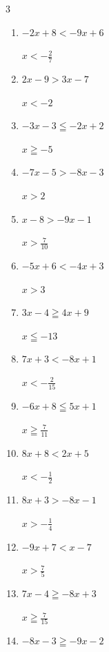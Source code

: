 \begin{multicols}{3}
\begin{enumerate}
        $\displaystyle x\geqq \frac{3}{4}$

  \item $-2x+8<-9x+6$

        $\displaystyle x<-\frac{2}{7}$

  \item $2x-9>3x-7$

        $\displaystyle x<-2$

  \item $-3x-3\leqq -2x+2$

        $\displaystyle x\geqq -5$

  \item $-7x-5>-8x-3$

        $\displaystyle x>2$

  \item $x-8>-9x-1$

        $\displaystyle x>\frac{7}{10}$

  \item $-5x+6<-4x+3$

        $\displaystyle x>3$

  \item $3x-4\geqq 4x+9$

        $\displaystyle x\leqq -13$

  \item $7x+3<-8x+1$

        $\displaystyle x<-\frac{2}{15}$

  \item $-6x+8\leqq 5x+1$

        $\displaystyle x\geqq \frac{7}{11}$

\columnbreak %

  \item $8x+8<2x+5$

        $\displaystyle x<-\frac{1}{2}$

  \item $8x+3>-8x-1$

        $\displaystyle x>-\frac{1}{4}$

  \item $-9x+7<x-7$

        $\displaystyle x>\frac{7}{5}$

  \item $7x-4\geqq -8x+3$

        $\displaystyle x\geqq \frac{7}{15}$

  \item $-8x-3\geqq -9x-2$


\end{enumerate}
\end{multicols}
